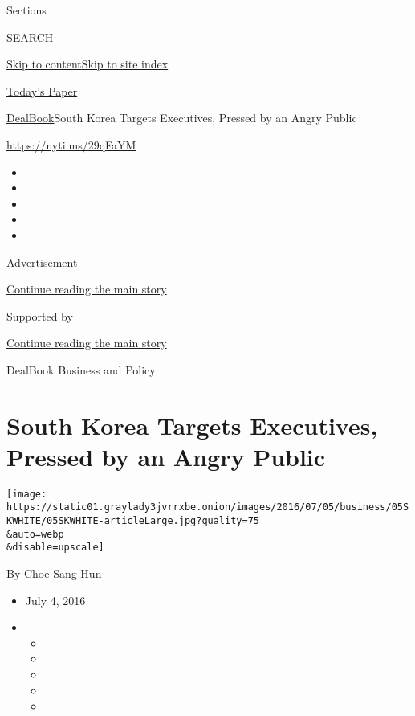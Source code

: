 Sections

SEARCH

\protect\hyperlink{site-content}{Skip to
content}\protect\hyperlink{site-index}{Skip to site index}

\href{https://myaccount.nytimes3xbfgragh.onion/auth/login?response_type=cookie\&client_id=vi}{}

\href{https://www.nytimes3xbfgragh.onion/section/todayspaper}{Today's
Paper}

\href{/section/business/dealbook}{DealBook}\textbar{}South Korea Targets
Executives, Pressed by an Angry Public

\url{https://nyti.ms/29qFaYM}

\begin{itemize}
\item
\item
\item
\item
\item
\end{itemize}

Advertisement

\protect\hyperlink{after-top}{Continue reading the main story}

Supported by

\protect\hyperlink{after-sponsor}{Continue reading the main story}

DealBook Business and Policy

\hypertarget{south-korea-targets-executives-pressed-by-an-angry-public}{%
\section{South Korea Targets Executives, Pressed by an Angry
Public}\label{south-korea-targets-executives-pressed-by-an-angry-public}}

\texttt{[image: https://static01.graylady3jvrrxbe.onion/images/2016/07/05/business/05SKWHITE/05SKWHITE-articleLarge.jpg?quality=75\\\&auto=webp\\\&disable=upscale]}

By \href{http://www.nytimes3xbfgragh.onion/by/choe-sang-hun}{Choe
Sang-Hun}

\begin{itemize}
\item
  July 4, 2016
\item
  \begin{itemize}
  \item
  \item
  \item
  \item
  \item
  \end{itemize}
\end{itemize}

